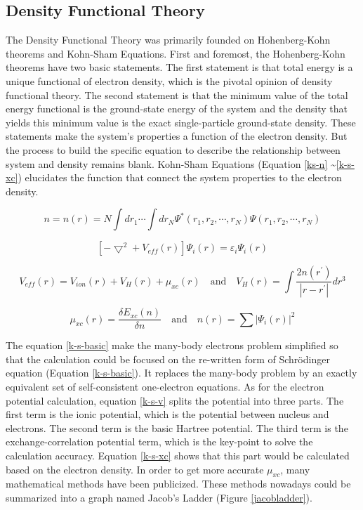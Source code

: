 \documentclass[letterpaper,12pt]{article}
\begin{document}
\subsection{Density Functional Theory}
The Density Functional Theory was primarily founded on Hohenberg-Kohn theorems\cite{hohenberg1964inhomogeneous} and Kohn-Sham Equations\cite{kohn1965self}. First and foremost, the Hohenberg-Kohn theorems have two basic statements. The first statement is that total energy is a unique functional of electron density, which is the pivotal opinion of density functional theory. The second statement is that the minimum value of the total energy functional is the ground-state energy of the system and the density that yields this minimum value is the exact single-particle ground-state density. These statements make the system's properties a function of the electron density. But the process to build the specific equation to describe the relationship between system and density remains blank. Kohn-Sham Equations (Equation \ref{ks-n} \textasciitilde \ref{k-s-xc}) elucidates the function that connect the system properties to the electron density.

\begin{equation} \label{ks-n}
n=n(r)=N\int dr_{1}\cdots \int dr_{N}\Psi ^{*}(r_{1},r_{2},\cdots,r_{N})\Psi(r_{1},r_{2},\cdots,r_{N})
\end{equation}

\begin{equation} \label{k-s-basic}
[-\bigtriangledown^{2}+V_{eff}(r)]\Psi_{i}(r)=\varepsilon_{i}\Psi_{i}(r)
\end{equation}

\begin{equation} \label{k-s-v}
V_{eff}(r)=V_{ion}(r)+V_{H}(r)+\mu_{xc}(r)
	\quad\mathrm{and}\quad
V_{H}(r)=\int \frac{2n(r^{'})}{\left | r-r^{'} \right |}dr^{3}
\end{equation}

\begin{equation} \label{k-s-xc}
\mu_{xc}(r)=\frac{\delta E_{xc}(n)}{\delta n}
	\quad\mathrm{and}\quad
n(r)=\sum \left | \Psi_{i}(r) \right |^{2}
\end{equation}

The equation \ref{k-s-basic} make the many-body electrons problem simplified so that the calculation could be focused on the re-written form of Schr\"odinger equation (Equation \ref{k-s-basic}). It replaces the many-body problem by an exactly equivalent set of self-consistent one-electron equations. As for the electron potential calculation, equation \ref{k-s-v} splits the potential into three parts. The first term is the ionic potential, which is the potential between nucleus and electrons. The second term is the basic Hartree potential. The third term is the exchange-correlation potential term, which is the key-point to solve the calculation accuracy\cite{gunnarsson1976exchange}. Equation \ref{k-s-xc} shows that this part would be calculated based on the electron density. In order to get more accurate  $\mu_{xc}$, many mathematical methods have been publicized. These methods nowadays could be summarized into a graph named Jacob's Ladder (Figure \ref{jacobladder}).
\end{document}
